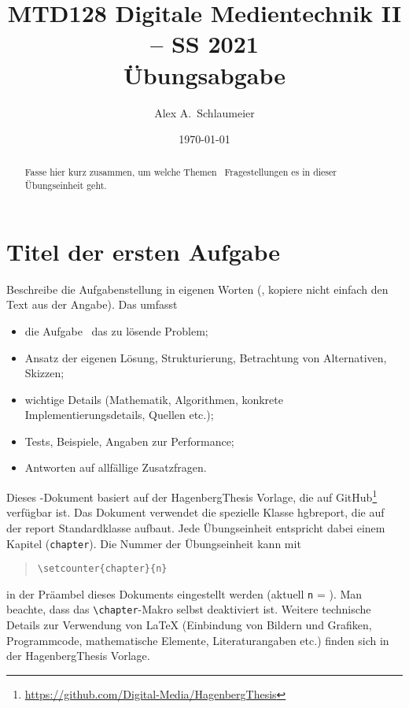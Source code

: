 \documentclass[german,notitlepage,smartquotes]{hgbreport}
\renewcommand{\chapter}[1]{} %
\begin{document}

\author{Alex A.\ Schlaumeier}                        %
\title{MTD128 Digitale Medientechnik II -- SS 2021\\ %
				Übungsabgabe }
\date{\today}

\maketitle

\begin{abstract}\noindent
Fasse hier kurz zusammen, um welche Themen \bzw\ Fragestellungen es in dieser
Übungseinheit geht.
\end{abstract}


\section{Titel der ersten Aufgabe}

Beschreibe die Aufgabenstellung in eigenen Worten 
(\dah, kopiere nicht einfach den Text aus der Angabe).
Das umfasst \ia 
%
\begin{itemize}
	\item die Aufgabe \bzw\ das zu lösende Problem;
	\item Ansatz der eigenen Lösung, Strukturierung, Betrachtung von
	Alternativen, Skizzen;
	\item wichtige Details (Mathematik, Algorithmen, konkrete
	Implementierungsdetails, Quellen \cite{Sedgewick2011} %
	etc.);
	\item Tests, Beispiele, Angaben zur Performance;
	\item Antworten auf allfällige Zusatzfragen.
\end{itemize}

Dieses \latex-Dokument basiert auf der \textsf{HagenbergThesis} Vorlage, die auf
GitHub\footnote{\url{https://github.com/Digital-Media/HagenbergThesis}}
verfügbar ist.
Das Dokument verwendet die spezielle Klasse \textsf{hgbreport}, die auf der
\textsf{report} Standardklasse aufbaut. Jede Übungseinheit entspricht dabei
einem Kapitel (\texttt{chapter}). Die Nummer der Übungseinheit kann mit
%
\begin{quote}
\verb!\setcounter{chapter}{n}!
\end{quote}
%
in der Präambel dieses Dokuments eingestellt werden (aktuell \texttt{n} =
).
Man beachte, dass das \verb!\chapter!-Makro selbst deaktiviert ist.
Weitere technische Details zur Verwendung von LaTeX (Einbindung von Bildern und
Grafiken, Programmcode, mathematische Elemente, Literaturangaben etc.) finden
sich in der \textsf{HagenbergThesis} Vorlage.
\end{document}
